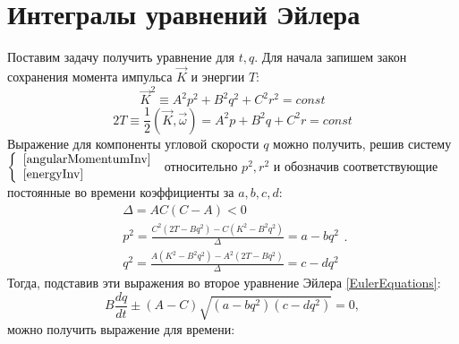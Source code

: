 \documentclass{article}
\begin{document}
\section{Интегралы уравнений Эйлера}
Поставим задачу получить уравнение для \begin{math} t, q \end{math}. Для начала запишем закон сохранения момента импульса \begin{math} \vec{K} \end{math} и энергии \begin{math} T \end{math}:
\begin{equation}
\label{angularMomentumInv}
\vec{K}^2\equiv A^2p^2+B^2q^2+C^2r^2=const
\end{equation}
\begin{equation}
\label{energyInv}
2T\equiv\frac{1}{2}\left(\vec{K},\vec{\omega}\right)=A^2p+B^2q+C^2r=const
\end{equation}
Выражение для компоненты угловой скорости \begin{math} q \end{math} можно получить, решив систему
\begin{math}
\left\{
\begin{array}{l}
\ref{angularMomentumInv}\\
\ref{energyInv}
\end{array}
\right.
\end{math}
относительно \begin{math} p^2, r^2\end{math} и обозначив соответствующие постоянные во времени коэффициенты за \begin{math} a, b, c, d \end{math}:
\begin{equation}
\begin{array}{l}
\Delta=AC(C-A)<0\\
p^2=\frac{C^2(2T-Bq^2)-C(K^2-B^2q^2)}{\Delta}=a-bq^2\\
q^2=\frac{A(K^2-B^2q^2)-A^2(2T-Bq^2)}{\Delta}=c-dq^2
\end{array}.
\end{equation}
Тогда, подставив эти выражения во второе уравнение Эйлера \ref{EulerEquations}:
\begin{equation}
B\frac{dq}{dt}\pm(A-C)\sqrt{(a-bq^2)(c-dq^2)}=0,
\end{equation}
можно получить выражение для времени:
\end{document}
